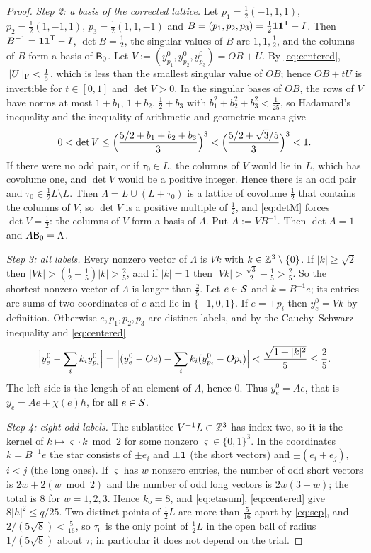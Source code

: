 \begin{proof}
\emph{Step 2: a basis of the corrected lattice.} Let $p_1=\frac12(-1,1,1)$, $p_2=\frac12(1,-1,1)$, $p_3=\frac12(1,1,-1)$ and
$B=(p_1,p_2,p_3)=\frac12\mathbf 1\mathbf 1^\mathsf T-I$. Then $B^{-1}=\mathbf 1\mathbf 1^\mathsf T-I$, $\det B=\frac12$, the singular values of $B$ are $1,1,\frac12$, and
the columns of $B$ form a basis of $\mathsf B_0$. Let $V:=(y^0_{p_1},y^0_{p_2},y^0_{p_3})=OB+U$. By \eqref{eq:centered}, $\|U\|_\mathrm F<\frac15$,
which is less than the smallest singular value of $OB$; hence $OB+tU$ is invertible for $t\in[0,1]$ and $\det V>0$. In the singular
bases of $OB$, the rows of $V$ have norms at most $1+b_1$, $1+b_2$, $\frac12+b_3$ with $b_1^2+b_2^2+b_3^2<\frac1{25}$, so Hadamard's
inequality and the inequality of arithmetic and geometric means give
\begin{equation}\label{eq:detM}
  0<\det V\le\Bigl(\frac{5/2+b_1+b_2+b_3}3\Bigr)^3<\Bigl(\frac{5/2+\sqrt3/5}3\Bigr)^3<1 .
\end{equation}
If there were no odd pair, or if $\tau_0\in L$, the columns of $V$ would lie in $L$, which has covolume one, and $\det V$ would be a
positive integer. Hence there is an odd pair and $\tau_0\in\frac12L\setminus L$. Then $\Lambda=L\cup(L+\tau_0)$ is a lattice of
covolume $\frac12$ that contains the columns of $V$, so $\det V$ is a positive multiple of $\frac12$, and \eqref{eq:detM} forces
$\det V=\frac12$: the columns of $V$ form a basis of $\Lambda$. Put $A:=VB^{-1}$. Then $\det A=1$ and $A\mathsf B_0=\Lambda$.

\emph{Step 3: all labels.} Every nonzero vector of $\Lambda$ is $Vk$ with $k\in\mathbb Z^3\setminus\{0\}$. If $|k|\ge\sqrt2$ then
$|Vk|>(\frac12-\frac15)|k|>\frac25$, and if $|k|=1$ then $|Vk|>\frac{\sqrt3}2-\frac15>\frac25$. So the shortest nonzero vector of
$\Lambda$ is longer than $\frac25$. Let $e\in\mathcal S$ and $k=B^{-1}e$; its entries are sums of two coordinates of $e$ and lie in
$\{-1,0,1\}$. If $e=\pm p_i$ then $y^0_e=Vk$ by definition. Otherwise $e,p_1,p_2,p_3$ are distinct labels, and by the
Cauchy--Schwarz inequality and \eqref{eq:centered}
\[
  \Bigl|y^0_e-\sum_ik_iy^0_{p_i}\Bigr|=\Bigl|(y^0_e-Oe)-\sum_ik_i(y^0_{p_i}-Op_i)\Bigr|<\frac{\sqrt{1+|k|^2}}5\le\frac25 .
\]
The left side is the length of an element of $\Lambda$, hence $0$. Thus $y^0_e=Ae$, that is $y_e=Ae+\chi(e)h$, for all $e\in\mathcal S$.

\emph{Step 4: eight odd labels.} The sublattice $V^{-1}L\subset\mathbb Z^3$ has index two, so it is the kernel of
$k\mapsto\varsigma\cdot k\bmod2$ for some nonzero $\varsigma\in\{0,1\}^3$. In the coordinates $k=B^{-1}e$ the star consists of
$\pm e_i$ and $\pm\mathbf 1$ (the short vectors) and $\pm(e_i+e_j)$, $i<j$ (the long ones). If $\varsigma$ has $w$ nonzero entries, the
number of odd short vectors is $2w+2(w\bmod2)$ and the number of odd long vectors is $2w(3-w)$; the total is $8$ for $w=1,2,3$. Hence
$k_{\mathrm o}=8$, and \eqref{eq:etasum}, \eqref{eq:centered} give $8|h|^2\le q/25$. Two distinct points of $\frac12L$ are more than
$\frac5{16}$ apart by \eqref{eq:sep}, and $2/(5\sqrt8)<\frac5{16}$, so $\tau_0$ is the only point of $\frac12L$ in the open ball of
radius $1/(5\sqrt8)$ about $\tau$; in particular it does not depend on the trial.


\end{proof}
